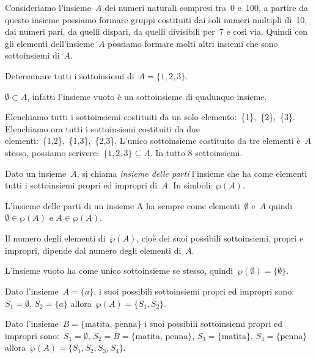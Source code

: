 Consideriamo l'insieme~\(A\) dei numeri naturali
compresi tra~0 e~100, a partire da questo insieme possiamo formare
gruppi costituiti dai soli numeri multipli di~10, dai numeri pari, da
quelli dispari, da quelli divisibili per~7 e così via. Quindi con gli
elementi dell'insieme~\(A\) possiamo formare molti
altri insiemi che sono sottoinsiemi di~\(A\).

 \begin{esempio}
Determinare tutti i sottoinsiemi di~\(A=\{1,2,3\}\).

\(\emptyset \subset A\), infatti l'insieme vuoto è un
sottoinsieme di qualunque insieme.

Elenchiamo tutti i sottoinsiemi costituiti da un solo 
elemento:~\{1\},~\{2\},~\{3\}.
Elenchiamo ora tutti i sottoinsiemi costituiti da due 
elementi:~\{1,2\},~\{1,3\},~\{2,3\}.
L'unico sottoinsieme costituito da tre elementi è~\(A\) stesso, possiamo 
scrivere:~\(\{1,2,3\}\subseteq A\). In tutto 8 sottoinsiemi.
 \end{esempio}


\begin{definizione}
Dato un insieme~\(A\), si chiama \emph{insieme delle parti} l'insieme che 
ha come elementi tutti i sottoinsiemi propri ed impropri di~\(A\). 
In simboli: \(\wp (A)\).
\end{definizione}

L'insieme delle parti di un insieme A ha sempre come
elementi~\(\emptyset \) e~\(A\) quindi~\(\emptyset\in\wp (A)\) e
\(A\in\wp (A)\).

Il numero degli elementi di~\(\wp (A)\), cioè dei suoi possibili
sottoinsiemi, propri e impropri, dipende dal numero degli elementi di~\(A\).

 \begin{esempio}
 L'insieme vuoto ha come unico sottoinsieme se stesso,
quindi~\(\wp (\emptyset )=\{\emptyset \}\).
 \end{esempio}

\begin{esempio}
 Dato l'insieme~\(A=\{a\}\), i suoi possibili sottoinsiemi
propri ed impropri sono:~\(S_{1}=\emptyset\), \(S_{2}=\{a\}\)
allora~\(\wp (A)=\{S_{1},S_{2}\}\).
 \end{esempio}

\begin{esempio}
 Dato l'insieme~\(B=\{\text{matita, penna}\}\) i
suoi possibili sottoinsiemi propri ed impropri sono:~\(S_{1}=\emptyset\),
\(S_{2}=B=\{\text{matita, penna}\}\), \(S_{3}=\{\text{matita}\}\),
\(S_{4}=\{\text{penna}\}\)
allora~\(\wp (A)=\{S_{1}, S_{2}, S_{3}, S_{4}\}\).
 \end{esempio}

